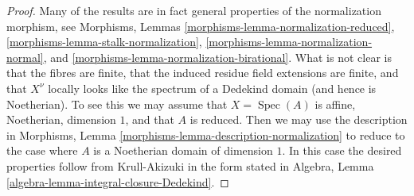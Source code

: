 \documentclass[10pt,a4paper]{amsart}
\theoremstyle{plain}
\theoremstyle{definition}
\theoremstyle{remark}
\numberwithin{equation}{subsection}
\def\Spec{\mathop{\mathrm{Spec}}}
\begin{document}
\begin{proof}
Many of the results are in fact general properties of the normalization
morphism, see
Morphisms, Lemmas \ref{morphisms-lemma-normalization-reduced},
\ref{morphisms-lemma-stalk-normalization},
\ref{morphisms-lemma-normalization-normal}, and
\ref{morphisms-lemma-normalization-birational}.
What is not clear is that the fibres are finite,
that the induced residue field extensions are finite, and
that $X^\nu$ locally looks like the spectrum of a
Dedekind domain (and hence is Noetherian).
To see this we may assume that $X = \Spec(A)$ is
affine, Noetherian, dimension $1$, and that $A$ is reduced.
Then we may use the description in
Morphisms, Lemma \ref{morphisms-lemma-description-normalization}
to reduce to the case where $A$ is a Noetherian domain
of dimension $1$. In this case the desired properties
follow from Krull-Akizuki in the form stated in
Algebra, Lemma \ref{algebra-lemma-integral-closure-Dedekind}.
\end{proof}
\end{document}

